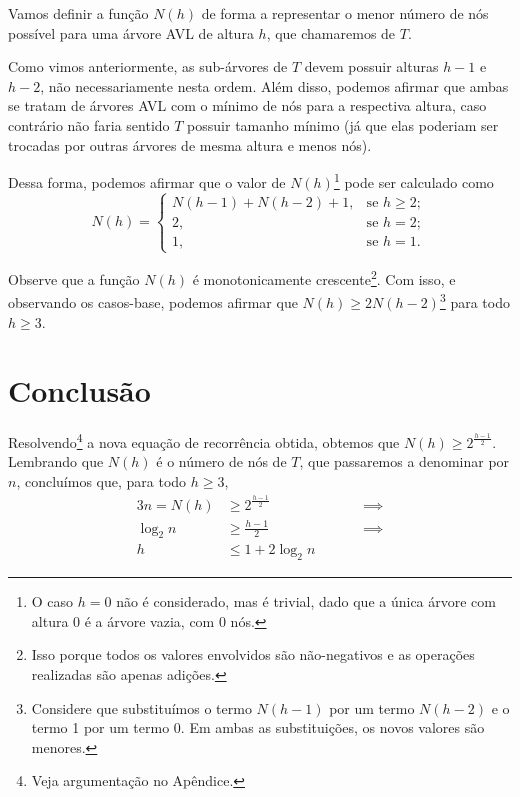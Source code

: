 \documentclass[10pt,a4paper,twoside]{article}
\theoremstyle{definition}
\begin{document}
      Vamos definir a função \( N(h) \) de forma a representar o menor número de nós possível para uma árvore AVL de altura \( h \), que chamaremos de \( T \).

      Como vimos anteriormente, as sub-árvores de \( T \) devem possuir alturas \( h-1 \) e \( h-2 \), não necessariamente nesta ordem. Além disso, podemos afirmar que ambas se tratam de árvores AVL com o mínimo de nós para a respectiva altura, caso contrário não faria sentido \( T \) possuir tamanho mínimo (já que elas poderiam ser trocadas por outras árvores de mesma altura e menos nós).

      Dessa forma, podemos afirmar que o valor de \( N(h) \)\footnote{O caso \( h = 0 \) não é considerado, mas é trivial, dado que a única árvore com altura 0 é a árvore vazia, com 0 nós.} pode ser calculado como \[ N(h) = \begin{cases}
          N(h-1) + N(h-2) + 1, & \text{se } h \geq 2; \\
          2                  , & \text{se } h = 2;    \\
          1                  , & \text{se } h = 1.
        \end{cases} \]

      Observe que a função \( N(h) \) é monotonicamente crescente\footnote{Isso porque todos os valores envolvidos são não-negativos e as operações realizadas são apenas adições.}. Com isso, e observando os casos-base, podemos afirmar que \( N(h) \geq 2N(h-2) \)\footnote{Considere que substituímos o termo \( N(h-1) \) por um termo \( N(h-2) \) e o termo 1 por um termo 0. Em ambas as substituições, os novos valores são menores.} para todo \( h \geq 3 \).

    \section{Conclusão}

     Resolvendo\footnote{Veja argumentação no Apêndice.} a nova equação de recorrência obtida, obtemos que \( N(h) \geq 2^{\frac{h-1}{2}} \). Lembrando que \( N(h) \) é o número de nós de \( T \), que passaremos a denominar por \( n \), concluímos que, para todo \( h \geq 3 \),
     \begin{alignat*}{3}
       n = N(h) & \geq 2^{\frac{h-1}{2}} & \quad &  & \implies \\
       \log_2 n & \geq \frac{h-1}{2}     & \quad &  & \implies \\
       h        & \leq 1 + 2 \log_2 n    & \quad &  &
     \end{alignat*}
\end{document}
